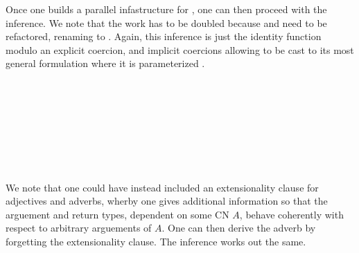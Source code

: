 Once one builds a parallel infastructure for , one can then
proceed with the inference. We note that the work has to be doubled because
 and 
need to be refactored, renaming  to . Again,
this inference is just the identity function modulo an explicit 
coercion, and implicit coercions allowing  to be cast to
its most general formulation where it is parameterized .

\begin{code}[hide]%
\>[0]\AgdaSpace{}%
\AgdaSymbol{:}\AgdaSpace{}%
\AgdaSpace{}%
\AgdaSpace{}%
\<%
\\
\>[0]\AgdaSpace{}%
\AgdaSpace{}%
\AgdaSymbol{=}\AgdaSpace{}%
\AgdaSpace{}%
\AgdaSpace{}%
\AgdaSpace{}%
\AgdaOperator{\AgdaFunction{\$}}\AgdaSpace{}%
\<%
\\
%
\\[\AgdaEmptyExtraSkip]%
\>[0]\AgdaSpace{}%
\AgdaSymbol{:}\AgdaSpace{}%
\<%
\\
\>[0]\AgdaSpace{}%
\AgdaSymbol{=}\AgdaSpace{}%
\AgdaSpace{}%
\AgdaSpace{}%
\<%
\end{code}
\begin{code}%
\>[0]\AgdaSpace{}%
\AgdaSymbol{:}\<%
\\
\>[0][@{}l@{\AgdaIndent{0}}]%
\>[2]\AgdaSpace{}%
\AgdaSpace{}%
\<%
\\
\>[0]\AgdaSpace{}%
\AgdaSymbol{(}\AgdaSpace{}%
\AgdaOperator{\AgdaInductiveConstructor{,}}\AgdaSpace{}%
\AgdaSymbol{)}\AgdaSpace{}%
\AgdaSymbol{=}\AgdaSpace{}%
\AgdaSymbol{(}\AgdaSpace{}%
\AgdaSymbol{)}\AgdaSpace{}%
\AgdaOperator{\AgdaInductiveConstructor{,}}\AgdaSpace{}%
\<%
\end{code}

We note that one could have instead included an extensionality clause for
adjectives and adverbs, wherby one gives additional information so that the
arguement and return types, dependent on some CN $A$, behave coherently with
respect to arbitrary arguements of $A$. One can then derive the adverb by
forgetting the extensionality clause. The inference works out the same.

